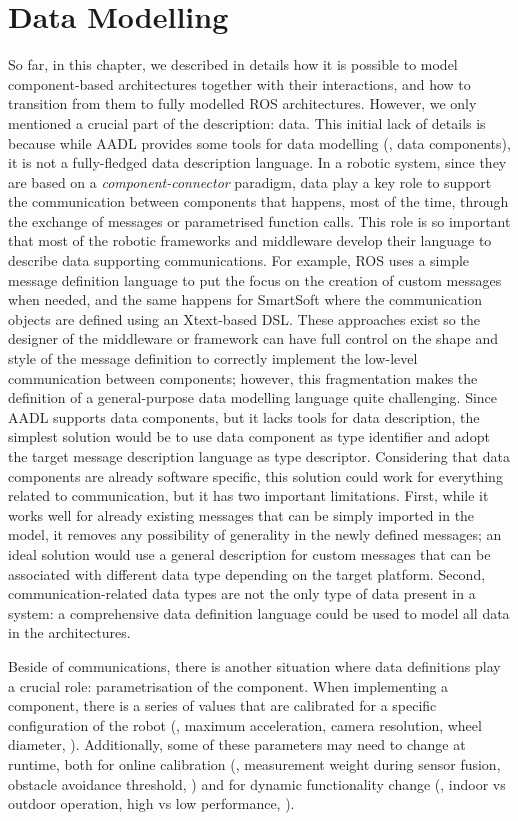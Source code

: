 \section{Data Modelling}
\label{sec:data}
So far, in this chapter, we described in details how it is possible to model component-based architectures together with their interactions, and how to transition from them to fully modelled ROS architectures. However, we only mentioned a crucial part of the description: data. This initial lack of details is because while AADL provides some tools for data modelling (\eg, data components), it is not a fully-fledged data description language. In a robotic system, since they are based on a  \textit{component-connector} paradigm, data play a key role to support the communication between components that happens, most of the time, through the exchange of messages or parametrised function calls. This role is so important that most of the robotic frameworks and middleware develop their language to describe data supporting communications. For example, ROS uses a simple message definition language to put the focus on the creation of custom messages when needed, and the same happens for SmartSoft where the communication objects are defined using an Xtext-based DSL. These approaches exist so the designer of the middleware or framework can have full control on the shape and style of the message definition to correctly implement the low-level communication between components; however, this fragmentation makes the definition of a general-purpose data modelling language quite challenging. Since AADL supports data components, but it lacks tools for data description, the simplest solution would be to use data component as type identifier and adopt the target message description language as type descriptor. Considering that data components are already software specific, this solution could work for everything related to communication, but it has two important limitations. First, while it works well for already existing messages that can be simply imported in the model, it removes any possibility of generality in the newly defined messages; an ideal solution would use a general description for custom messages that can be associated with different data type depending on the target platform. Second, communication-related data types are not the only type of data present in a system: a comprehensive data definition language could be used to model all data in the architectures.

Beside of communications, there is another situation where data definitions play a crucial role: parametrisation of the component. When implementing a component, there is a series of values that are calibrated for a specific configuration of the robot (\eg, maximum acceleration, camera resolution, wheel diameter, \etc). Additionally, some of these parameters may need to change at runtime, both for online calibration (\eg, measurement weight during sensor fusion, obstacle avoidance threshold, \etc) and for dynamic functionality change (\eg, indoor vs outdoor operation, high vs low performance, \etc). 

